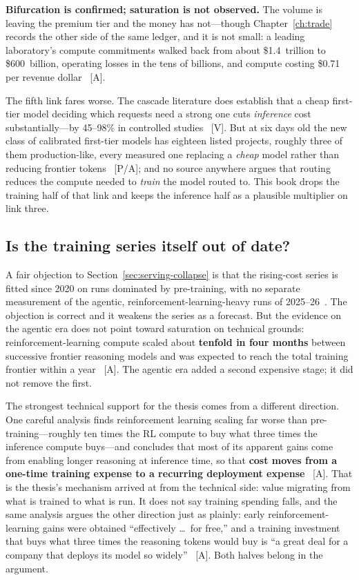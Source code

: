 \textbf{Bifurcation is confirmed; saturation is not observed.} The volume is leaving the premium tier and the money has not---though Chapter~\ref{ch:trade} records the other side of the same ledger, and it is not small: a leading laboratory's compute commitments walked back from about \$1.4~trillion to \$600~billion, operating losses in the tens of billions, and compute costing \$0.71 per revenue dollar~\cite{openai-reset,openai-econ} [A].

The fifth link fares worse. The cascade literature does establish that a cheap first-tier model deciding which requests need a strong one cuts \emph{inference} cost substantially---by 45--98\% in controlled studies~\cite{cascades} [V]. But at six days old the new class of calibrated first-tier models has eighteen listed projects, roughly three of them production-like, every measured one replacing a \emph{cheap} model rather than reducing frontier tokens~\cite{jev-exemplars} [P/A]; and no source anywhere argues that routing reduces the compute needed to \emph{train} the model routed to. This book drops the training half of that link and keeps the inference half as a plausible multiplier on link three.

\subsection{Is the training series itself out of date?}

A fair objection to Section~\ref{sec:serving-collapse} is that the rising-cost series is fitted since 2020 on runs dominated by pre-training, with no separate measurement of the agentic, reinforcement-learning-heavy runs of 2025--26~\cite{epoch-training-cost,epoch-rl-scaling}. The objection is correct and it weakens the series as a forecast. But the evidence on the agentic era does not point toward saturation on technical grounds: reinforcement-learning compute scaled about \textbf{tenfold in four months} between successive frontier reasoning models and was expected to reach the total training frontier within a year~\cite{epoch-rl-scaling} [A]. The agentic era added a second expensive stage; it did not remove the first.

The strongest technical support for the thesis comes from a different direction. One careful analysis finds reinforcement learning scaling far worse than pre-training---roughly ten times the RL compute to buy what three times the inference compute buys---and concludes that most of its apparent gains come from enabling longer reasoning at inference time, so that \textbf{cost moves from a one-time training expense to a recurring deployment expense}~\cite{ord-rl} [A]. That is the thesis's mechanism arrived at from the technical side: value migrating from what is trained to what is run. It does not say training spending falls, and the same analysis argues the other direction just as plainly: early reinforcement-learning gains were obtained ``effectively \ldots\ for free,'' and a training investment that buys what three times the reasoning tokens would buy is ``a great deal for a company that deploys its model so widely''~\cite{ord-rl} [A]. Both halves belong in the argument.

